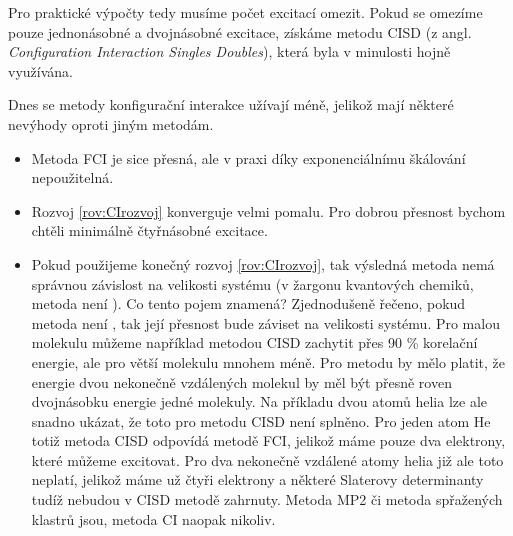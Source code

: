 Pro praktické výpočty tedy musíme počet excitací omezit. Pokud se omezíme pouze jednonásobné a dvojnásobné excitace, získáme metodu CISD (z angl. \textit{Configuration Interaction Singles Doubles}), která byla v minulosti hojně využívána.

Dnes se metody konfigurační interakce užívají méně, jelikož mají některé nevýhody oproti jiným metodám. 
\begin{itemize}
\item Metoda FCI je sice přesná, ale v praxi díky exponenciálnímu škálování nepoužitelná.
\item Rozvoj \ref{rov:CIrozvoj} konverguje velmi pomalu. Pro dobrou přesnost bychom chtěli minimálně čtyřnásobné excitace.
\item Pokud použijeme konečný rozvoj \ref{rov:CIrozvoj}, tak výsledná metoda nemá správnou závislost na velikosti systému (v žargonu kvantových chemiků, metoda není ). Co tento pojem znamená? Zjednodušeně řečeno, pokud metoda není , tak její přesnost bude záviset na velikosti systému. Pro malou molekulu můžeme například metodou CISD zachytit přes 90 \% korelační energie, ale pro větší molekulu mnohem méně. Pro  metodu by mělo platit, že energie dvou nekonečně vzdálených molekul by měl být přesně roven dvojnásobku energie jedné molekuly. Na příkladu dvou atomů helia lze ale snadno ukázat, že toto pro metodu CISD není splněno. Pro jeden atom He totiž metoda CISD odpovídá metodě FCI, jelikož máme pouze dva elektrony, které můžeme excitovat. Pro dva nekonečně vzdálené atomy helia již ale toto neplatí, jelikož máme už čtyři elektrony a některé Slaterovy determinanty tudíž nebudou v CISD metodě zahrnuty. 
Metoda MP2 či metoda spřažených klastrů  jsou, metoda CI naopak nikoliv. 
\end{itemize}



